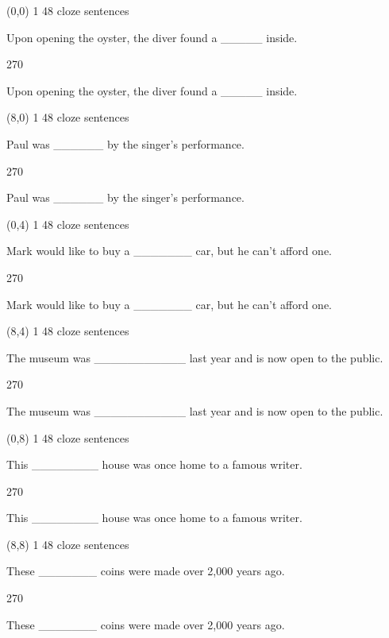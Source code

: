 \documentclass[a4paper]{article}
\newenvironment{itemize*}%
{\begin{itemize}%
 \setlength{\itemsep}{0.5cm}%
 \setlength{\parsep}{0pt}%
 \setlength{\parskip}{0pt}}%
{\end{itemize}}
\newcommand{\mycard}[3]{%
	\small #1 #2
	\par
	\parbox[t][6.8cm][c]{9.5cm}{%
	\par
	\myleft{#3}
	\par
	\myright{#3}
	}
}
\newcommand{\myleft}[1]{%
	\begin{sideways}
	\hspace*{-0.9cm}
		\parbox[t][2.7cm][t]{6.5cm}{%
		\large #1
		}
	\end{sideways}
}
\newcommand{\myright}[1]{%
	\hspace*{6.5cm}
	\begin{turn}{270}
	\hspace*{-7.1cm}
		\parbox[t][2.7cm][t]{6.5cm}{%
		\large #1
		}
	\end{turn}
}
\begin{document}
\begin{textblock}{8}(0,0)
\mycard{1}{48 cloze sentences}{
\begin{itemize*}
\item Upon opening the oyster, the diver found a \_\_\_\_\_ inside.
\end{itemize*}
}
\end{textblock}

\begin{textblock}{8}(8,0)
\mycard{1}{48 cloze sentences}{
\begin{itemize*}
\item Paul was \_\_\_\_\_\_ by the singer's performance.
\end{itemize*}
}
\end{textblock}

\begin{textblock}{8}(0,4)
\mycard{1}{48 cloze sentences}{
\begin{itemize*}
\item Mark would like to buy a \_\_\_\_\_\_\_ car, but he can't afford one.
\end{itemize*}
}
\end{textblock}

\begin{textblock}{8}(8,4)
\mycard{1}{48 cloze sentences}{
\begin{itemize*}
\item The museum was \_\_\_\_\_\_\_\_\_\_\_ last year and is now open to the public.
\end{itemize*}
}
\end{textblock}

\begin{textblock}{8}(0,8)
\mycard{1}{48 cloze sentences}{
\begin{itemize*}
\item This \_\_\_\_\_\_\_\_ house was once home to a famous writer.
\end{itemize*}
}
\end{textblock}

\begin{textblock}{8}(8,8)
\mycard{1}{48 cloze sentences}{
\begin{itemize*}
\item These \_\_\_\_\_\_\_ coins were made over 2,000 years ago.
\end{itemize*}
}
\end{textblock}
\end{document}
